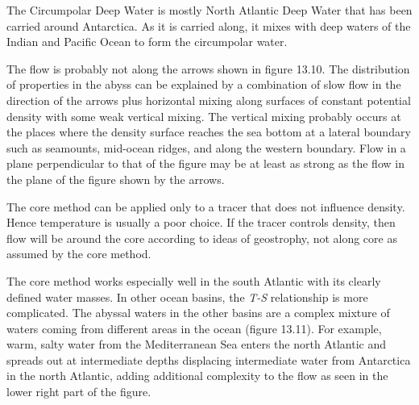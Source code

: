 The Circumpolar Deep Water is
mostly North Atlantic Deep Water that has been carried around
Antarctica. As it is carried along, it mixes with deep waters of the
Indian and Pacific Ocean to form the circumpolar water.

The flow is probably not along the arrows shown in figure 13.10. The
distribution of properties in the abyss can be explained
by a combination of slow flow in the direction of the arrows plus
horizontal mixing along
surfaces of constant potential density with some weak vertical
mixing. The vertical
mixing probably occurs at the places where the
density surface reaches the sea bottom at a lateral boundary such as
seamounts, mid-ocean ridges, and along the western boundary. Flow in a
plane perpendicular to that of the figure may be at least as strong as
the flow in the plane of the figure shown by the arrows.

The core method can be applied only to a tracer
that does not influence density. Hence temperature is usually a poor
choice. If the tracer controls den\-sity, then flow will be around the
core according to ideas of geostrophy, not along core as assumed by
the core method.

The core method works especially well in the south Atlantic with its
clearly defined water masses. In other ocean basins, the \textit{T-S}
relationship is more complicated. The abyssal waters in the other
basins are a complex mixture of waters coming from different areas in
the ocean (figure 13.11). For example, warm, salty water from the
Mediterranean Sea enters the north Atlantic and spreads out at
intermediate depths displacing intermediate water from Antarctica in
the north Atlantic, adding additional complexity to the flow as seen
in the lower right part of the figure.

